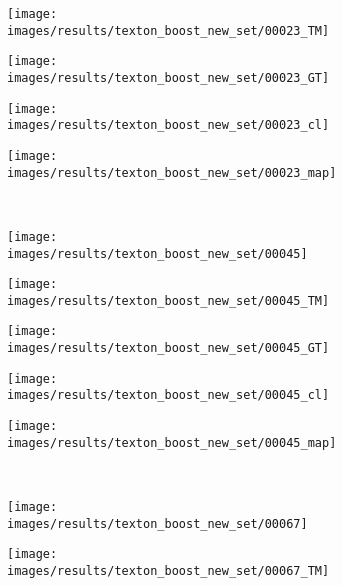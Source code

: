 \begin{figure}[t]
\begin{subfigure}[c]{0.19\textwidth}
 \end{subfigure}
 \begin{subfigure}[c]{0.19\textwidth}
  \centering
  \texttt{[image: images/results/texton\_boost\_new\_set/00023\_TM]}
 \end{subfigure}
 \begin{subfigure}[c]{0.19\textwidth}
  \centering
  \texttt{[image: images/results/texton\_boost\_new\_set/00023\_GT]}
 \end{subfigure}
 \begin{subfigure}[c]{0.19\textwidth}
  \centering
  \texttt{[image: images/results/texton\_boost\_new\_set/00023\_cl]}
 \end{subfigure}
 \begin{subfigure}[c]{0.19\textwidth}
  \centering
  \texttt{[image: images/results/texton\_boost\_new\_set/00023\_map]}
 \end{subfigure}
 \\
 \begin{subfigure}[c]{0.19\textwidth}
  \centering
  \texttt{[image: images/results/texton\_boost\_new\_set/00045]}
 \end{subfigure}
 \begin{subfigure}[c]{0.19\textwidth}
  \centering
  \texttt{[image: images/results/texton\_boost\_new\_set/00045\_TM]}
 \end{subfigure}
 \begin{subfigure}[c]{0.19\textwidth}
  \centering
  \texttt{[image: images/results/texton\_boost\_new\_set/00045\_GT]}
 \end{subfigure}
 \begin{subfigure}[c]{0.19\textwidth}
  \centering
  \texttt{[image: images/results/texton\_boost\_new\_set/00045\_cl]}
 \end{subfigure}
 \begin{subfigure}[c]{0.19\textwidth}
  \centering
  \texttt{[image: images/results/texton\_boost\_new\_set/00045\_map]}
 \end{subfigure}
 \\
 \begin{subfigure}[c]{0.19\textwidth}
  \centering
  \texttt{[image: images/results/texton\_boost\_new\_set/00067]}
 \end{subfigure}
 \begin{subfigure}[c]{0.19\textwidth}
  \centering
  \texttt{[image: images/results/texton\_boost\_new\_set/00067\_TM]}

\end{subfigure}
\end{figure}
